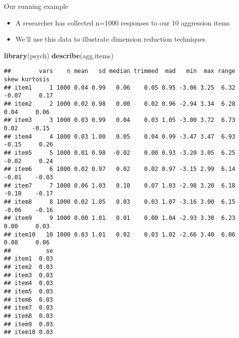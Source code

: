 \documentclass[
  ignorenonframetext,
]{beamer}
\newenvironment{Shaded}{\begin{snugshade}}{\end{snugshade}}
\newcommand{\KeywordTok}[1]{\textcolor[rgb]{0.13,0.29,0.53}{\textbf{#1}}}
\newcommand{\NormalTok}[1]{#1}
\providecommand{\tightlist}{%
  \setlength{\itemsep}{0pt}\setlength{\parskip}{0pt}}
\begin{document}
\begin{frame}[fragile]{Our running example}
\protect\hypertarget{our-running-example}{}

\begin{itemize}
\tightlist
\item
  A researcher has collected n=1000 responses to our 10 aggression items
\item
  We'll use this data to illustrate dimension reduction techniques
\end{itemize}

\begin{Shaded}
\begin{Highlighting}[]
\KeywordTok{library}\NormalTok{(psych)}
\KeywordTok{describe}\NormalTok{(agg.items)}
\end{Highlighting}
\end{Shaded}

\begin{verbatim}
##        vars    n mean   sd median trimmed  mad   min  max range  skew kurtosis
## item1     1 1000 0.04 0.99   0.06    0.05 0.95 -3.06 3.25  6.32 -0.07     0.17
## item2     2 1000 0.02 0.98   0.00    0.02 0.96 -2.94 3.34  6.28  0.04     0.06
## item3     3 1000 0.03 0.99   0.04    0.03 1.05 -3.00 3.72  6.73  0.02    -0.15
## item4     4 1000 0.03 1.00   0.05    0.04 0.99 -3.47 3.47  6.93 -0.15     0.26
## item5     5 1000 0.01 0.98  -0.02    0.00 0.93 -3.20 3.05  6.25 -0.02     0.24
## item6     6 1000 0.02 0.97   0.02    0.02 0.97 -3.15 2.99  6.14 -0.01    -0.03
## item7     7 1000 0.06 1.03   0.10    0.07 1.03 -2.98 3.20  6.18 -0.10    -0.17
## item8     8 1000 0.02 1.05   0.03    0.03 1.07 -3.16 3.00  6.15 -0.06    -0.16
## item9     9 1000 0.00 1.01   0.01    0.00 1.04 -2.93 3.30  6.23  0.00     0.03
## item10   10 1000 0.03 1.01   0.02    0.03 1.02 -2.66 3.40  6.06  0.08     0.06
##          se
## item1  0.03
## item2  0.03
## item3  0.03
## item4  0.03
## item5  0.03
## item6  0.03
## item7  0.03
## item8  0.03
## item9  0.03
## item10 0.03
\end{verbatim}

\end{frame}
\end{document}
